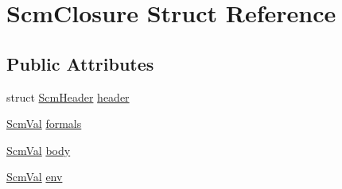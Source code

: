 \hypertarget{struct_scm_closure}{\section{Scm\-Closure Struct Reference}
\label{struct_scm_closure}
}
\subsection*{Public Attributes}
\begin{DoxyCompactItemize}
\item 
struct \hyperlink{struct_scm_header}{Scm\-Header} \hyperlink{struct_scm_closure_a05fbc3affee4ed8375c0310437d23b47}{header}
\item 
\hyperlink{eva_8h_a9e754b130d398cb7a4000c8c7a046427}{Scm\-Val} \hyperlink{struct_scm_closure_a45bf58a061c3073254ce46be81d76c71}{formals}
\item 
\hyperlink{eva_8h_a9e754b130d398cb7a4000c8c7a046427}{Scm\-Val} \hyperlink{struct_scm_closure_a6d3f56515432cb5237491324860a2f81}{body}
\item 
\hyperlink{eva_8h_a9e754b130d398cb7a4000c8c7a046427}{Scm\-Val} \hyperlink{struct_scm_closure_adf8e8c293b4c14ff06ea886f8d910e00}{env}
\end{DoxyCompactItemize}



